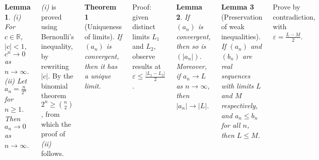 \documentclass{tikzposter} %
\newtheorem{theorem}{Theorem}
\newtheorem{lemma}{Lemma}
\begin{document}
\begin{columns}
{{    \begin{lemma}
      (i) For $c \in \mathbb{R}$, $|c| < 1$, $c^{n} \to 0$ as $n \to \infty$. \\
      (ii) Let $a_{n} = \frac{n}{2^{n}}$ for $n \ge 1$. Then $a_{n} \to 0$ as $n \to \infty$. \\
    \end{lemma}
    \emph{(i)} is proved using Bernoulli's inequality, by rewriting $|c|$. By the binomial theorem $2^{n} \ge {n \choose 2}$, from which the proof of \emph{(ii)} follows.\\
    \begin{theorem}[Uniqueness of limits]
      If $(a_{n})$ is convergent, then it has a unique limit.\\
    \end{theorem}
    Proof: given distinct limits $L_{1}$ and $L_{2}$, observe results at $\varepsilon \le \frac{|L_{1}-L_{2}|}{2}$.\\

    \begin{lemma}
      If $(a_{n})$ is convergent, then so is $(|a_{n}|)$. Moreover, if $a_{n} \to L$ as $n \to \infty$, then $|a_{n}| \to |L|$.\\
    \end{lemma}

    \begin{lemma}[Preservation of weak inequalities]
        If $(a_{n})$ and $(b_{n})$ are real sequences with limits $L$ and $M$ respectively, and $a_{n} \le b_{n}$ for all $n$, then $L \le M$.\\
    \end{lemma}
    Prove by contradiction, with $\varepsilon = \frac{L-M}{2}$. \\

}}
\end{columns}
\end{document}
